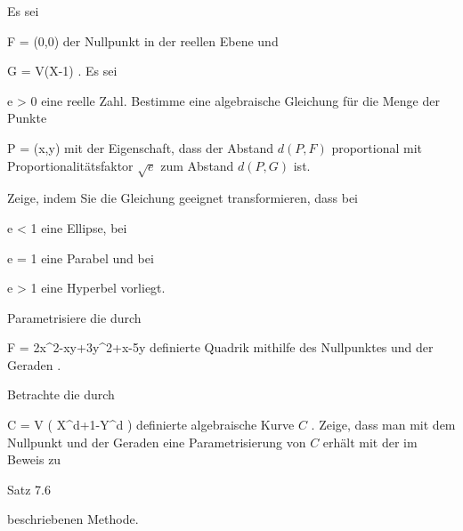 {}
{





Es sei

\mavergleichskette
{\vergleichskette
{ F
}
{ = }{ (0,0)
}
{  }{
}
{    }{
}
{   }{
}
}
{}{}{}
der Nullpunkt in der reellen Ebene und

\mavergleichskette
{\vergleichskette
{ G
}
{ = }{ V(X-1)
}
{  }{
}
{    }{
}
{   }{
}
}
{}{}{.}
Es sei

\mavergleichskette
{\vergleichskette
{ e
}
{ > }{ 0
}
{  }{
}
{    }{
}
{   }{
}
}
{}{}{}
eine reelle Zahl. Bestimme eine algebraische Gleichung für die Menge der Punkte

\mavergleichskette
{\vergleichskette
{ P
}
{ = }{ (x,y)
}
{  }{
}
{    }{
}
{   }{
}
}
{}{}{}
mit der Eigenschaft, dass der Abstand $d(P,F)$ proportional mit Proportionalitätsfaktor $\sqrt{e}$ zum
 {} {}
Abstand $d(P,G)$ ist.

Zeige, indem Sie die Gleichung geeignet transformieren, dass bei

\mavergleichskette
{\vergleichskette
{ e
}
{ < }{ 1
}
{  }{
}
{    }{
}
{   }{
}
}
{}{}{}
eine Ellipse, bei

\mavergleichskette
{\vergleichskette
{ e
}
{ = }{ 1
}
{  }{
}
{    }{
}
{   }{
}
}
{}{}{}
eine Parabel und bei

\mavergleichskette
{\vergleichskette
{ e
}
{ > }{ 1
}
{  }{
}
{    }{
}
{   }{
}
}
{}{}{}
eine Hyperbel vorliegt.





}
{} {}

{}
{





Parametrisiere die durch

\mavergleichskettedisp
{\vergleichskette
{F
}
{ =} { 2x^2-xy+3y^2+x-5y
}
{ } {
}
{ } {
}
{ } {
}
}
{}{}{}
definierte Quadrik mithilfe des Nullpunktes und der Geraden
.





}
{} {}

{}
{





Betrachte die durch

\mavergleichskettedisp
{\vergleichskette
{ C
}
{ =} { V \left(  X^{d+1}-Y^d  \right)
}
{ } {
}
{ } {
}
{ } {
}
}
{}{}{}
definierte algebraische Kurve $C$
 {} {.}
Zeige, dass man mit dem Nullpunkt und der Geraden
 eine Parametrisierung von $C$ erhält mit der im Beweis zu

Satz 7.6

beschriebenen Methode.





}
{} {}

